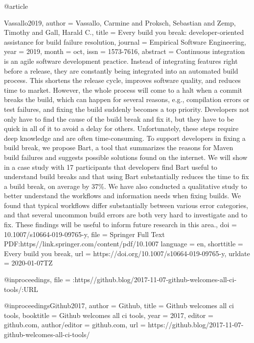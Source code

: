 {{{{{@article{Vassallo2019,
  author     = {Vassallo, Carmine and Proksch, Sebastian and Zemp, Timothy and Gall, Harald C.},
  title      = {Every build you break: developer-oriented assistance for build failure resolution},
  journal    = {Empirical Software Engineering},
  year       = {2019},
  month      = oct,
  issn       = {1573-7616},
  abstract   = {Continuous integration is an agile software development practice. Instead of integrating features right before a release, they are constantly being integrated into an automated build process. This shortens the release cycle, improves software quality, and reduces time to market. However, the whole process will come to a halt when a commit breaks the build, which can happen for several reasons, e.g., compilation errors or test failures, and fixing the build suddenly becomes a top priority. Developers not only have to find the cause of the build break and fix it, but they have to be quick in all of it to avoid a delay for others. Unfortunately, these steps require deep knowledge and are often time-consuming. To support developers in fixing a build break, we propose Bart, a tool that summarizes the reasons for Maven build failures and suggests possible solutions found on the internet. We will show in a case study with 17 participants that developers find Bart useful to understand build breaks and that using Bart substantially reduces the time to fix a build break, on average by 37\%. We have also conducted a qualitative study to better understand the workflows and information needs when fixing builds. We found that typical workflows differ substantially between various error categories, and that several uncommon build errors are both very hard to investigate and to fix. These findings will be useful to inform future research in this area.},
  doi        = {10.1007/s10664-019-09765-y},
  file       = {Springer Full Text PDF:https\://link.springer.com/content/pdf/10.1007%
  language   = {en},
  shorttitle = {Every build you break},
  url        = {https://doi.org/10.1007/s10664-019-09765-y},
  urldate    = {2020-01-07TZ}
}

@inproceedings{,
  file = {:https\://github.blog/2017-11-07-github-welcomes-all-ci-tools/:URL}
}

@inproceedings{Github2017,
  author        = {Github},
  title         = {Github welcomes all ci tools},
  booktitle     = {Github welcomes all ci tools},
  year          = {2017},
  editor        = {github.com},
  author/editor = {github.com},
  url           = {https://github.blog/2017-11-07-github-welcomes-all-ci-tools/}
}

}}}}}}
